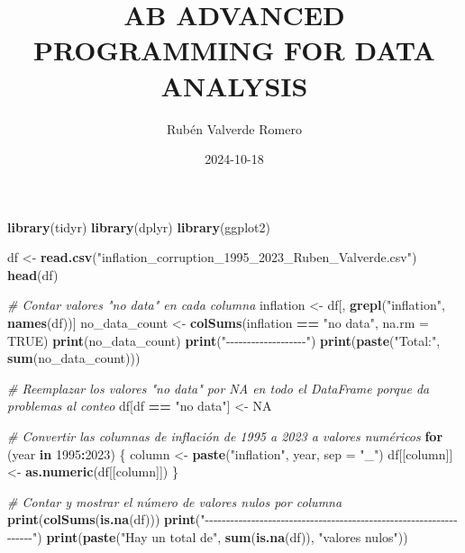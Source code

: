 \documentclass[
]{article}
\title{AB ADVANCED PROGRAMMING FOR DATA ANALYSIS}
\author{Rubén Valverde Romero}
\date{2024-10-18}
\newenvironment{Shaded}{\begin{snugshade}}{\end{snugshade}}
\newcommand{\AttributeTok}[1]{\textcolor[rgb]{0.13,0.29,0.53}{#1}}
\newcommand{\CommentTok}[1]{\textcolor[rgb]{0.56,0.35,0.01}{\textit{#1}}}
\newcommand{\ConstantTok}[1]{\textcolor[rgb]{0.56,0.35,0.01}{#1}}
\newcommand{\ControlFlowTok}[1]{\textcolor[rgb]{0.13,0.29,0.53}{\textbf{#1}}}
\newcommand{\DecValTok}[1]{\textcolor[rgb]{0.00,0.00,0.81}{#1}}
\newcommand{\FunctionTok}[1]{\textcolor[rgb]{0.13,0.29,0.53}{\textbf{#1}}}
\newcommand{\NormalTok}[1]{#1}
\newcommand{\OtherTok}[1]{\textcolor[rgb]{0.56,0.35,0.01}{#1}}
\newcommand{\SpecialCharTok}[1]{\textcolor[rgb]{0.81,0.36,0.00}{\textbf{#1}}}
\newcommand{\StringTok}[1]{\textcolor[rgb]{0.31,0.60,0.02}{#1}}
\begin{document}
\maketitle

\begin{Shaded}
\begin{Highlighting}[]
\FunctionTok{library}\NormalTok{(tidyr)}
\FunctionTok{library}\NormalTok{(dplyr)}
\FunctionTok{library}\NormalTok{(ggplot2)}

\NormalTok{df }\OtherTok{\textless{}{-}} \FunctionTok{read.csv}\NormalTok{(}\StringTok{"inflation\_corruption\_1995\_2023\_Ruben\_Valverde.csv"}\NormalTok{)}
\FunctionTok{head}\NormalTok{(df)}

\CommentTok{\# Contar valores "no data" en cada columna}
\NormalTok{inflation }\OtherTok{\textless{}{-}}\NormalTok{ df[, }\FunctionTok{grepl}\NormalTok{(}\StringTok{"inflation"}\NormalTok{, }\FunctionTok{names}\NormalTok{(df))]}
\NormalTok{no\_data\_count }\OtherTok{\textless{}{-}} \FunctionTok{colSums}\NormalTok{(inflation }\SpecialCharTok{==} \StringTok{"no data"}\NormalTok{, }\AttributeTok{na.rm =} \ConstantTok{TRUE}\NormalTok{)}
\FunctionTok{print}\NormalTok{(no\_data\_count)}
\FunctionTok{print}\NormalTok{(}\StringTok{"{-}{-}{-}{-}{-}{-}{-}{-}{-}{-}{-}{-}{-}{-}{-}{-}{-}{-}{-}"}\NormalTok{)}
\FunctionTok{print}\NormalTok{(}\FunctionTok{paste}\NormalTok{(}\StringTok{"Total:"}\NormalTok{, }\FunctionTok{sum}\NormalTok{(no\_data\_count)))}

\CommentTok{\# Reemplazar los valores "no data" por NA en todo el DataFrame porque da problemas al conteo}
\NormalTok{df[df }\SpecialCharTok{==} \StringTok{"no data"}\NormalTok{] }\OtherTok{\textless{}{-}} \ConstantTok{NA}

\CommentTok{\# Convertir las columnas de inflación de 1995 a 2023 a valores numéricos}
\ControlFlowTok{for}\NormalTok{ (year }\ControlFlowTok{in} \DecValTok{1995}\SpecialCharTok{:}\DecValTok{2023}\NormalTok{) \{}
\NormalTok{  column }\OtherTok{\textless{}{-}} \FunctionTok{paste}\NormalTok{(}\StringTok{"inflation"}\NormalTok{, year, }\AttributeTok{sep =} \StringTok{"\_"}\NormalTok{)}
\NormalTok{  df[[column]] }\OtherTok{\textless{}{-}} \FunctionTok{as.numeric}\NormalTok{(df[[column]])}
\NormalTok{\}}

\CommentTok{\# Contar y mostrar el número de valores nulos por columna}
\FunctionTok{print}\NormalTok{(}\FunctionTok{colSums}\NormalTok{(}\FunctionTok{is.na}\NormalTok{(df)))}
\FunctionTok{print}\NormalTok{(}\StringTok{"{-}{-}{-}{-}{-}{-}{-}{-}{-}{-}{-}{-}{-}{-}{-}{-}{-}{-}{-}{-}{-}{-}{-}{-}{-}{-}{-}{-}{-}{-}{-}{-}{-}{-}{-}{-}{-}{-}{-}{-}{-}{-}{-}{-}{-}{-}{-}{-}{-}{-}{-}{-}{-}{-}{-}{-}{-}{-}{-}{-}{-}{-}{-}{-}{-}{-}"}\NormalTok{)}
\FunctionTok{print}\NormalTok{(}\FunctionTok{paste}\NormalTok{(}\StringTok{"Hay un total de"}\NormalTok{, }\FunctionTok{sum}\NormalTok{(}\FunctionTok{is.na}\NormalTok{(df)), }\StringTok{"valores nulos"}\NormalTok{))}



\end{Highlighting}
\end{Shaded}
\end{document}
